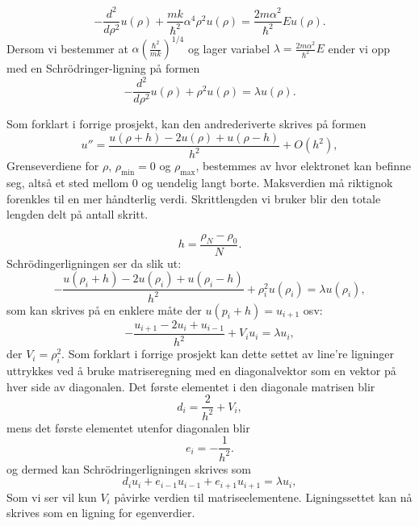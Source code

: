 \documentclass[12pt]{article}
\begin{document}
\begin{equation*}
  -\frac{d^2}{d\rho^2} u(\rho) 
       + \frac{mk}{\hbar^2} \alpha^4\rho^2u(\rho)  = \frac{2m\alpha^2}{\hbar^2}E u(\rho) .
\end{equation*}
Dersom vi bestemmer at $\alpha  \left(\frac{\hbar^2}{mk}\right)^{1/4}$ og lager variabel $\lambda = \frac{2m\alpha^2}{\hbar^2}E$
ender vi opp med en Schrödringer-ligning på formen
\begin{equation*}
  -\frac{d^2}{d\rho^2} u(\rho) + \rho^2u(\rho)  = \lambda u(\rho) .
\end{equation*}

Som forklart i forrige prosjekt, kan den andrederiverte skrives på formen
\begin{equation}
    u''=\frac{u(\rho+h) -2u(\rho) +u(\rho-h)}{h^2} +O(h^2),
    \label{eq:diffoperation}
\end{equation}
Grenseverdiene for $\rho$, $\rho_{\mathrm{min}}=0$ og $\rho_{\mathrm{max}}$, bestemmes av hvor elektronet kan befinne seg, altså et sted mellom 0 og uendelig langt borte. Maksverdien må riktignok forenkles til en mer håndterlig verdi. Skrittlengden vi bruker blir den totale lengden delt på antall skritt.

\begin{equation*}
  h=\frac{\rho_N-\rho_0 }{N}.
\end{equation*}
Schrödingerligningen ser da slik ut:
$$
-\frac{u(\rho_i+h) -2u(\rho_i) +u(\rho_i-h)}{h^2}+\rho_i^2u(\rho_i)  = \lambda u(\rho_i),
$$
som kan skrives på en enklere måte der $u(p_i+h)=u_{i+1}$ osv:
$$
-\frac{u_{i+1} -2u_i +u_{i-1} }{h^2}+V_iu_i  = \lambda u_i,
$$
der $V_i=\rho_i^2$. Som forklart i forrige prosjekt kan dette settet av line're ligninger uttrykkes ved å bruke matriseregning med en diagonalvektor som en vektor på hver side av diagonalen. Det første elementet i den diagonale matrisen blir
\begin{equation*}
   d_i=\frac{2}{h^2}+V_i,
\end{equation*}
mens det første elementet utenfor diagonalen blir
\begin{equation*}
   e_i=-\frac{1}{h^2}.
\end{equation*}
og dermed kan Schrödringerligningen skrives som
\begin{equation*}
d_iu_i+e_{i-1}u_{i-1}+e_{i+1}u_{i+1}  = \lambda u_i,
\end{equation*}
Som vi ser vil kun $V_i$ påvirke verdien til matriseelementene. Ligningssettet kan nå skrives som en ligning for egenverdier.
\end{document}

